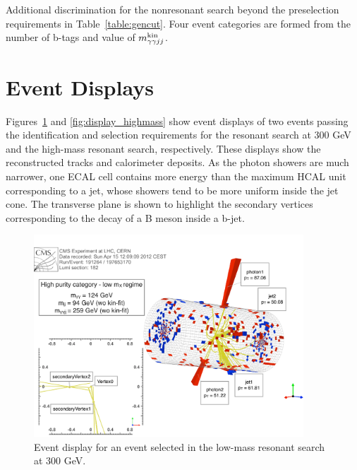 \begin{table}[ht]
  \centering
  \renewcommand{\arraystretch}{1.4}
  \caption{Additional discrimination for the nonresonant search beyond the preselection requirements
in Table~\ref{table:gencut}. Four event categories are formed from the number of b-tags and value of
$m_{\gamma\gamma jj}^{\rm kin}$.}
  
  \label{table:nonres_addcuts}
\end{table}

\section{Event Displays\label{sec:displays}}

Figures~\ref{fig:display_lowmass} and \ref{fig:display_highmass} show event displays of two events
passing the identification and selection requirements for the resonant search at 300 GeV and the
high-mass resonant search, respectively. These displays show the reconstructed tracks and calorimeter
deposits. As the photon showers are much narrower, one ECAL cell contains more energy
than the maximum HCAL unit corresponding to a jet, whose showers tend to be more uniform inside
the jet cone. The transverse plane is shown to highlight the secondary vertices corresponding to
the decay of a B meson inside a b-jet.

\begin{figure}[ht]
 \begin{center}
   \includegraphics[width=0.9\textwidth]{figures/selection/display_evt300.pdf}
 \end{center}
\caption{Event display for an event selected in the low-mass resonant search at 300 GeV.}
\label{fig:display_lowmass}
\end{figure}

